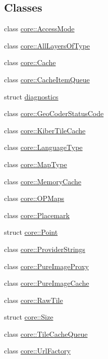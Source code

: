 \subsection*{Classes}
\begin{DoxyCompactItemize}
\item 
class \hyperlink{classcore_1_1_access_mode}{core\-::\-Access\-Mode}
\item 
class \hyperlink{classcore_1_1_all_layers_of_type}{core\-::\-All\-Layers\-Of\-Type}
\item 
class \hyperlink{classcore_1_1_cache}{core\-::\-Cache}
\item 
class \hyperlink{classcore_1_1_cache_item_queue}{core\-::\-Cache\-Item\-Queue}
\item 
struct \hyperlink{structdiagnostics}{diagnostics}
\item 
class \hyperlink{classcore_1_1_geo_coder_status_code}{core\-::\-Geo\-Coder\-Status\-Code}
\item 
class \hyperlink{classcore_1_1_kiber_tile_cache}{core\-::\-Kiber\-Tile\-Cache}
\item 
class \hyperlink{classcore_1_1_language_type}{core\-::\-Language\-Type}
\item 
class \hyperlink{classcore_1_1_map_type}{core\-::\-Map\-Type}
\item 
class \hyperlink{classcore_1_1_memory_cache}{core\-::\-Memory\-Cache}
\item 
class \hyperlink{classcore_1_1_o_p_maps}{core\-::\-O\-P\-Maps}
\item 
class \hyperlink{classcore_1_1_placemark}{core\-::\-Placemark}
\item 
struct \hyperlink{structcore_1_1_point}{core\-::\-Point}
\item 
class \hyperlink{classcore_1_1_provider_strings}{core\-::\-Provider\-Strings}
\item 
class \hyperlink{classcore_1_1_pure_image_proxy}{core\-::\-Pure\-Image\-Proxy}
\item 
class \hyperlink{classcore_1_1_pure_image_cache}{core\-::\-Pure\-Image\-Cache}
\item 
class \hyperlink{classcore_1_1_raw_tile}{core\-::\-Raw\-Tile}
\item 
struct \hyperlink{structcore_1_1_size}{core\-::\-Size}
\item 
class \hyperlink{classcore_1_1_tile_cache_queue}{core\-::\-Tile\-Cache\-Queue}
\item 
class \hyperlink{classcore_1_1_url_factory}{core\-::\-Url\-Factory}
\item 

\end{DoxyCompactItemize}
